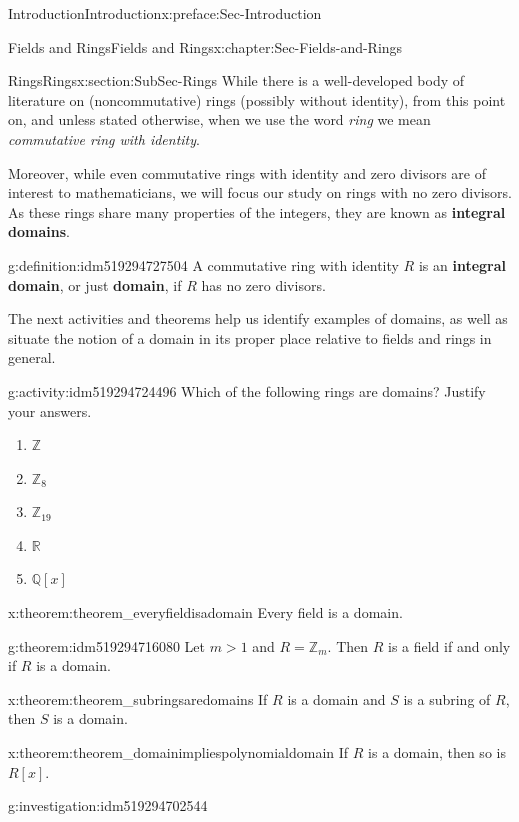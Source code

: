 \documentclass[oneside,10pt,]{book}
\newcommand{\terminology}[1]{\textbf{#1}}
\numberwithin{equation}{section}
\def\Z{{\mathbb Z}}
\def\Q{{\mathbb Q}}
\def\R{{\mathbb R}}
\begin{document}
\begin{preface}{Introduction}{}{Introduction}{}{}{x:preface:Sec-Introduction}
\begin{chapterptx}{Fields and Rings}{}{Fields and Rings}{}{}{x:chapter:Sec-Fields-and-Rings}
\begin{sectionptx}{Rings}{}{Rings}{}{}{x:section:SubSec-Rings}
While there is a well-developed body of literature on (noncommutative) rings (possibly without identity), from this point on, and unless stated otherwise, when we use the word \emph{ring} we mean \emph{commutative ring with identity}.%
\par
Moreover, while even commutative rings with identity and zero divisors are of interest to mathematicians, we will focus our study on rings with no zero divisors. As these rings share many properties of the integers, they are known as \terminology{integral domains}.%
\begin{definition}{}{g:definition:idm519294727504}%
%
%
A commutative ring with identity \(R\) is an \terminology{integral domain}, or just \terminology{domain}, if \(R\) has no zero divisors.%
\end{definition}
The next activities and theorems help us identify examples of domains, as well as situate the notion of a domain in its proper place relative to fields and rings in general.%
\begin{activity}{}{g:activity:idm519294724496}%
Which of the following rings are domains? Justify your answers.%
\begin{enumerate}
\item{}\(\Z\)%
\item{}\(\Z_{8}\)%
\item{}\(\Z_{19}\)%
\item{}\(\R\)%
\item{}\(\Q[x]\)%
\end{enumerate}
%
\end{activity}
\begin{theorem}{}{}{x:theorem:theorem_everyfieldisadomain}%
Every field is a domain.%
\end{theorem}
\begin{theorem}{}{}{g:theorem:idm519294716080}%
Let \(m > 1\) and \(R = \Z_m\). Then \(R\) is a field if and only if \(R\) is a domain.%
\end{theorem}
\begin{theorem}{}{}{x:theorem:theorem_subringsaredomains}%
If \(R\) is a domain and \(S\) is a subring of \(R\), then \(S\) is a domain.%
\end{theorem}
\begin{theorem}{}{}{x:theorem:theorem_domainimpliespolynomialdomain}%
If \(R\) is a domain, then so is \(R[x]\).%
\end{theorem}
\begin{investigation}{}{g:investigation:idm519294702544}%

\end{investigation}
\end{sectionptx}
\end{chapterptx}
\end{preface}
\end{document}
